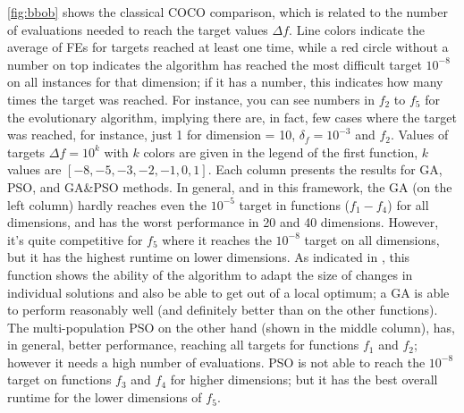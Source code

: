 \documentclass[runningheads]{llncs}
\begin{document}
\autoref{fig:bbob} shows the classical COCO comparison, which is
related to the number of evaluations needed to reach the target values
$\Delta f$. Line colors indicate the average of FEs for targets reached
at least one time, while a red circle without a number on top indicates the algorithm
has reached the most difficult target $10^{-8}$ on all instances for that dimension;
if it has a number, this indicates how many times the target was
reached. For instance, you can see numbers in $f_2$ to $f_5$ for the
evolutionary algorithm, implying there are, in fact, few cases where
the target was reached, for instance, just 1 for dimension = 10,
$\delta_f = 10^{-3}$ and $f_2$. Values of targets $\Delta f = 10^{k}$ with $k$ colors are
given in the legend of the first function, $k$ values are $[-8,-5,-3,-2,-1,0,1]$.
Each column presents the results for GA, PSO, and GA\&PSO methods.
In general, and in this framework, the GA (on the left column) hardly reaches even the
$10^{-5}$ target in functions ($f_1-f_4$) for all dimensions, and has the worst
performance in 20 and 40 dimensions. However, it's quite competitive for $f_5$
where it reaches the $10^{-8}$ target on all dimensions, but it has the highest runtime on lower
dimensions. As indicated in \cite{hansen2009real}, this function shows
the ability of the algorithm to adapt the size of changes in
individual solutions and also be
able to get out of a local optimum; a GA is able to perform reasonably
well (and definitely better than on the other functions).
The multi-population PSO on the other hand (shown in the middle column),
has, in general, better performance, reaching all targets for
functions $f_1$ and $f_2$; however it needs a high number of evaluations.
PSO is not able to reach the $10^{-8}$ target on functions $f_3$ and $f_4$ for higher dimensions; 
but it has the best overall runtime for the lower dimensions of $f_5$.
\end{document}
